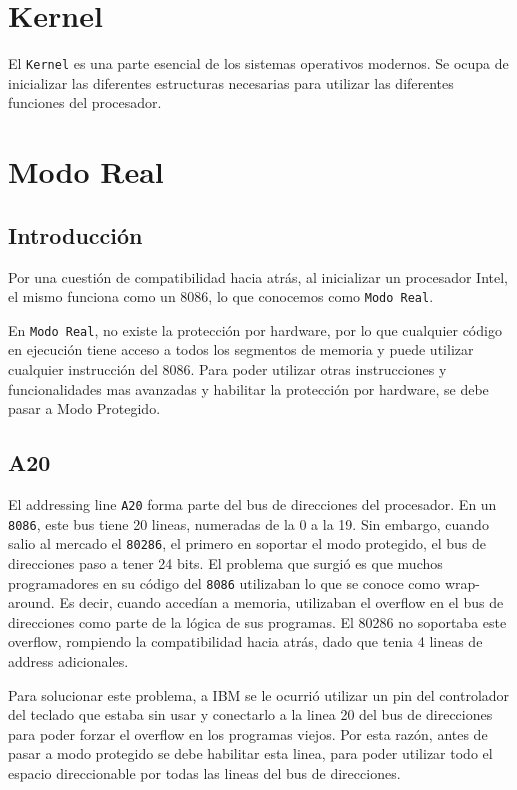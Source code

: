 \section{Kernel}

El \texttt{Kernel} es una parte esencial de los sistemas operativos modernos. Se ocupa de inicializar las diferentes estructuras necesarias para utilizar las diferentes funciones del procesador.

\section{Modo Real}

\subsection{Introducción}

Por una cuestión de compatibilidad hacia atrás, al inicializar un procesador Intel, el mismo funciona como un 8086, lo que conocemos como \texttt{Modo Real}. 

En \texttt{Modo Real}, no existe la protección por hardware, por lo que cualquier código en ejecución tiene acceso a todos los segmentos de memoria y puede utilizar cualquier instrucción del 8086. Para poder utilizar otras instrucciones y funcionalidades mas avanzadas y habilitar la protección por hardware, se debe pasar a Modo Protegido.

\subsection{A20}
El addressing line \texttt{A20} forma parte del bus de direcciones del procesador. En un \texttt{8086}, este bus tiene 20 lineas, numeradas de la 0 a la 19. Sin embargo, cuando salio al mercado el \texttt{80286}, el primero en soportar el modo protegido,  el bus de direcciones paso a tener 24 bits. El problema que surgió es que muchos programadores en su código del \texttt{8086} utilizaban lo que se conoce como wrap-around. Es decir, cuando accedían a memoria, utilizaban el overflow en el bus de direcciones como parte de la lógica de sus programas. El 80286 no soportaba este overflow, rompiendo la compatibilidad hacia atrás, dado que tenia 4 lineas de address adicionales.

Para solucionar este problema, a IBM se le ocurrió utilizar un pin del controlador del teclado que estaba sin usar y conectarlo a la linea 20 del bus de direcciones para poder forzar el overflow en los programas viejos. Por esta razón, antes de pasar a modo protegido se debe habilitar esta linea, para poder utilizar todo el espacio direccionable por todas las lineas del bus de direcciones.

